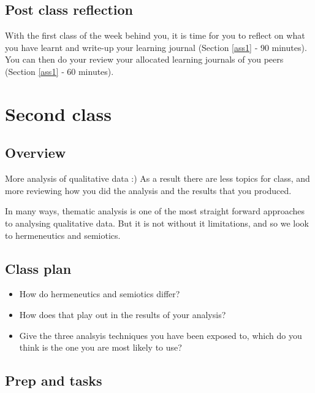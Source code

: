 \documentclass[]{book}
\theoremstyle{definition}
\theoremstyle{definition}
\theoremstyle{definition}
\theoremstyle{remark}
\begin{document}
\hypertarget{post-class-reflection-6}{%
\subsection{Post class reflection}\label{post-class-reflection-6}}

With the first class of the week behind you, it is time for you to
reflect on what you have learnt and write-up your learning journal
(Section \ref{ass1} ‐ 90 minutes). You can then do your review your
allocated learning journals of you peers (Section \ref{ass1} ‐ 60
minutes).

\hypertarget{second-class-3}{%
\section*{Second class}\label{second-class-3}}

\hypertarget{overview-7}{%
\subsection*{Overview}\label{overview-7}}

More analysis of qualitative data :) As a result there are less topics
for class, and more reviewing how you did the analysis and the results
that you produced.

In many ways, thematic analysis is one of the most straight forward
approaches to analysing qualitative data. But it is not without it
limitations, and so we look to hermeneutics and semiotics.

\hypertarget{class-plan-7}{%
\subsection*{Class plan}\label{class-plan-7}}

\begin{itemize}
\item
  How do hermeneutics and semiotics differ?
\item
  How does that play out in the results of your analysis?
\item
  Give the three analsyis techniques you have been exposed to, which do
  you think is the one you are most likely to use?
\end{itemize}

\hypertarget{prep-and-tasks-7}{%
\subsection*{Prep and tasks}\label{prep-and-tasks-7}}
\end{document}
